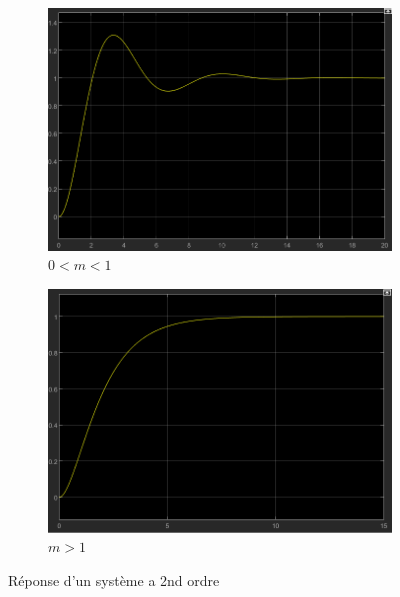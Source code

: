 \documentclass[12pt, a4paper]{report}
\begin{document}
\begin{figure}
    \begin{subfigure}[h!]{0.4\linewidth}
        \includegraphics[width=\linewidth]{reponse2ndordresmallz.png}
        \caption{$0 < m < 1$}
        \end{subfigure}
        \hfill
        \begin{subfigure}[h!]{0.4\linewidth}
        \includegraphics[width=\linewidth]{reponse2ndordrebigz.png}
        \caption{$m > 1$}
    \end{subfigure}%
    \caption{Réponse d'un système a 2nd ordre}
\end{figure}
\end{document}
